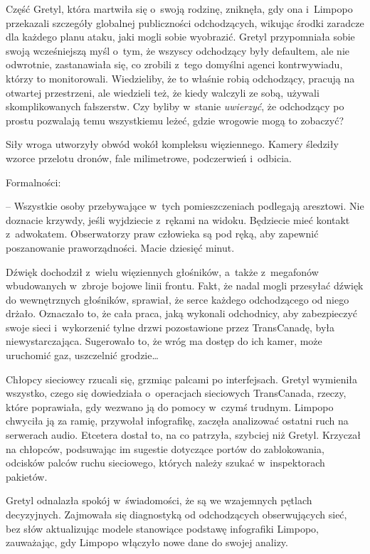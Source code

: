 \documentclass[oneside,polish,11pt,sfheadings]{mwbk}
\begin{document}
Część Gretyl, która martwiła się o~swoją rodzinę, zniknęła, gdy ona i~Limpopo przekazali szczegóły globalnej publiczności odchodzących,
wikując środki zaradcze dla każdego planu ataku, jaki mogli sobie
wyobrazić. Gretyl przypomniała sobie swoją wcześniejszą myśl o~tym, że
wszyscy odchodzący były defaultem, ale nie odwrotnie, zastanawiała się,
co zrobili z~tego domyślni agenci kontrwywiadu, którzy to monitorowali.
Wiedzieliby, że to właśnie robią odchodzący, pracują na otwartej
przestrzeni, ale wiedzieli też, że kiedy walczyli ze sobą, używali
skomplikowanych fałszerstw. Czy byliby w~stanie \textit{uwierzyć}, że
odchodzący po prostu pozwalają temu wszystkiemu leżeć, gdzie wrogowie
mogą to zobaczyć?

Siły wroga utworzyły obwód wokół kompleksu więziennego. Kamery śledziły
wzorce przelotu dronów, fale milimetrowe, podczerwień i~odbicia.

Formalności: 

-- Wszystkie osoby przebywające w~tych pomieszczeniach
podlegają aresztowi. Nie doznacie krzywdy, jeśli wyjdziecie z~rękami na
widoku. Będziecie mieć kontakt z~adwokatem. Obserwatorzy praw człowieka
są pod ręką, aby zapewnić poszanowanie praworządności. Macie dziesięć
minut. 

Dźwięk dochodził z~wielu więziennych głośników, a~także z~megafonów wbudowanych w~zbroje bojowe linii frontu. Fakt, że nadal mogli
przesyłać dźwięk do wewnętrznych głośników, sprawiał, że serce każdego
odchodzącego od niego drżało. Oznaczało to, że cała praca, jaką wykonali
odchodnicy, aby zabezpieczyć swoje sieci i~wykorzenić tylne drzwi
pozostawione przez TransCanadę, była niewystarczająca. Sugerowało to, że
wróg ma dostęp do ich kamer, może uruchomić gaz, uszczelnić grodzie\ldots 

Chłopcy sieciowcy rzucali się, grzmiąc palcami po interfejsach. Gretyl
wymieniła wszystko, czego się dowiedziała o~operacjach sieciowych
TransCanada, rzeczy, które poprawiała, gdy wezwano ją do pomocy w~czymś
trudnym. Limpopo chwyciła ją za ramię, przywołał infografikę, zaczęła
analizować ostatni ruch na serwerach audio. Etcetera dostał to, na co
patrzyła, szybciej niż Gretyl. Krzyczał na chłopców, podsuwając im
sugestie dotyczące portów do zablokowania, odcisków palców ruchu
sieciowego, których należy szukać w~inspektorach pakietów.

Gretyl odnalazła spokój w~świadomości, że są we wzajemnych pętlach
decyzyjnych. Zajmowała się diagnostyką od odchodzących obserwujących
sieć, bez słów aktualizując modele stanowiące podstawę infografiki
Limpopo, zauważając, gdy Limpopo włączyło nowe dane do swojej analizy.
\end{document}
